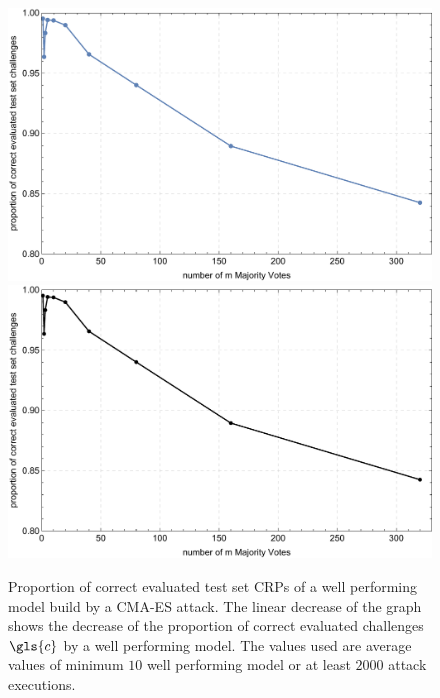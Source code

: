 \begin{figure}[ht]
\ifx{}\undefined
{}
\else
	\if{}
	\centering
	\includegraphics[width=1.00\textwidth]{images/single-mv-classification-cma-attack-correctness.pdf}
	\else
	\includegraphics[width=1.00\textwidth]{images/single-mv-classification-cma-attack-correctness_mono.pdf}
	\fi
\fi
\caption[Proportion of correct evaluated test set challenges for Arbiter \puf models and Majority Arbiter \puf models]{Proportion of correct evaluated test set \acp{CRP} of a well performing model build by a \ac{CMA-ES} attack. The linear decrease of the graph shows the decrease of the proportion of correct evaluated challenges $\gls{c}$ by a well performing model. The values used are average values of minimum $10$ well performing model or at least $2000$ attack executions.}
\label{fig:cmasingleattackcorrectness}
\end{figure}

